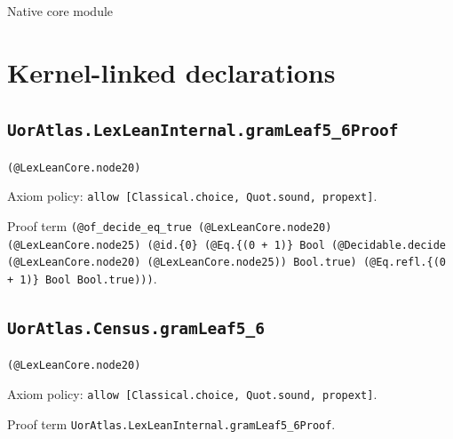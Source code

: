 \documentclass[11pt]{article}
\begin{document}
\begin{center}{\LARGE Native core module}\end{center}
\section*{Kernel-linked declarations}
\subsection*{\texttt{UorAtlas.LexLeanInternal.gramLeaf5\_6Proof}}
\noindent\texttt{(@LexLeanCore.node20)}\par
\noindent Axiom policy: \texttt{allow [Classical.choice, Quot.sound, propext]}.\par
\noindent Proof term \texttt{(@of\_decide\_eq\_true (@LexLeanCore.node20) (@LexLeanCore.node25) (@id.\{0\} (@Eq.\{(0 + 1)\} Bool (@Decidable.decide (@LexLeanCore.node20) (@LexLeanCore.node25)) Bool.true) (@Eq.refl.\{(0 + 1)\} Bool Bool.true)))}.\par
\subsection*{\texttt{UorAtlas.Census.gramLeaf5\_6}}
\noindent\texttt{(@LexLeanCore.node20)}\par
\noindent Axiom policy: \texttt{allow [Classical.choice, Quot.sound, propext]}.\par
\noindent Proof term \texttt{UorAtlas.LexLeanInternal.gramLeaf5\_6Proof}.\par
\end{document}
